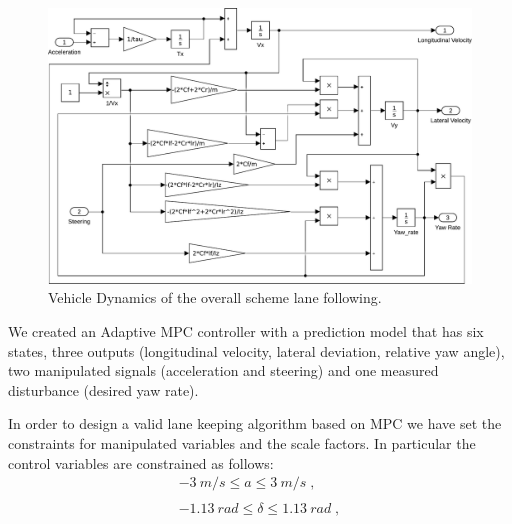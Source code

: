 \begin{figure}[!h]
	\centering
	\includegraphics[width=\textwidth]{../figure/lane_following_AMPC_vehicle_dynamics.pdf}
	\caption{Vehicle Dynamics of the overall scheme lane following.}
	\label{fig:scheme_lane_following_vehicle_dynamics}
\end{figure}
We created an Adaptive MPC controller with a prediction model that has six states, three outputs (longitudinal velocity, lateral deviation, relative yaw angle), two manipulated signals (acceleration and steering) and one measured disturbance (desired yaw rate).

In order to design a valid lane keeping algorithm based on MPC we have set the constraints for manipulated variables and the scale factors. In particular the control
variables are constrained as follows:
\begin{equation}
\label{eqn:constraint_LKA}
\begin{array}{cc}
	\SI{-3}{m/s}\leq a\leq\SI{3}{m/s}\;,\\\\
	\SI{-1.13}{rad}\leq \delta \leq \SI{1.13}{rad}\;,
\end{array}
\end{equation}

